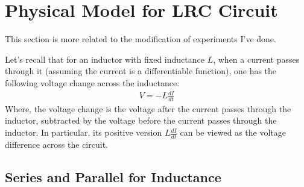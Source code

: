 \documentclass{article}
\begin{document}
\newpage

\section{Physical Model for LRC Circuit}

This section is more related to the modification of experiments I've done.

Let's recall that for an inductor with fixed inductance $L$, when a current passes through it (assuming the current is a differentiable function), one has the following voltage change across the inductance:
\begin{align}
    V = -L\frac{dI}{dt}
\end{align}
Where, the voltage change is the voltage after the current passes through the inductor, subtracted by the voltage before the current passes through the inductor. In particular, its positive version $L\frac{dI}{dt}$ can be viewed as the voltage difference across the circuit.

\hfil

\subsection{Series and Parallel for Inductance}
\end{document}
